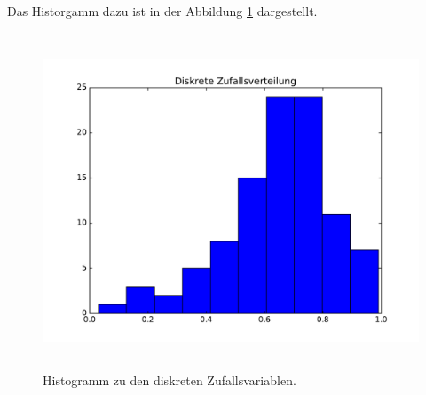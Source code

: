 
Das Historgamm dazu ist in der Abbildung \ref{fig:A1eplot} dargestellt.
\begin{figure}
  \centering
  \includegraphics[height = 10cm]{plots/A1eplot.pdf}
  \caption{Histogramm zu den diskreten Zufallsvariablen.}
  \label{fig:A1eplot}
\end{figure}
 

